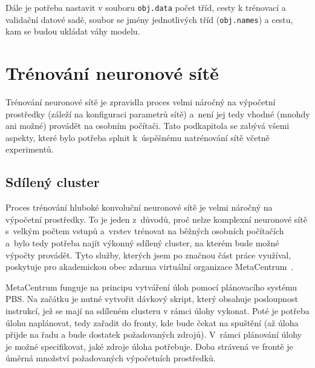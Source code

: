 Dále je potřeba nastavit v souboru \texttt{obj.data} počet tříd, cesty k trénovací a validační datové sadě, soubor se jmény jednotlivých tříd (\texttt{obj.names}) a cestu, kam se budou ukládat váhy modelu.


\section{Trénování neuronové sítě}
Trénování neuronové sítě je zpravidla proces velmi náročný na výpočetní prostředky (záleží na konfiguraci parametrů sítě) a~není jej tedy vhodné (mnohdy ani možné) provádět na osobním počítači. Tato podkapitola se zabývá všemi aspekty, které bylo potřeba splnit k~úspěšnému natrénování sítě včetně experimentů.

\subsection*{Sdílený cluster}
Proces trénování hluboké konvoluční neuronové sítě je velmi náročný na výpočetní prostředky. To je jeden z~důvodů, proč nelze komplexní neuronové sítě s~velkým počtem vstupů a~vrstev trénovat na běžných osobních počítačích a~bylo tedy potřeba najít výkonný sdílený cluster, na kterém bude možné výpočty provádět. Tyto služby, kterých jsem po značnou část práce využíval, poskytuje pro akademickou obec zdarma virtuální organizace MetaCentrum~\cite{metacentrum}.

MetaCentrum funguje na principu vytváření úloh pomocí plánovacího systému PBS\footnotemark. Na začátku je nutné vytvořit dávkový skript, který obsahuje posloupnost instrukcí, jež se mají na sdíleném clusteru v rámci úlohy vykonat. Poté je potřeba úlohu naplánovat, tedy zařadit do fronty, kde bude čekat na spuštění (až úloha přijde na řadu a bude dostatek požadovaných zdrojů). V~rámci plánování úlohy je možné specifikovat, jaké zdroje úloha potřebuje. Doba strávená ve frontě je úměrná množství požadovaných výpočetních prostředků.

